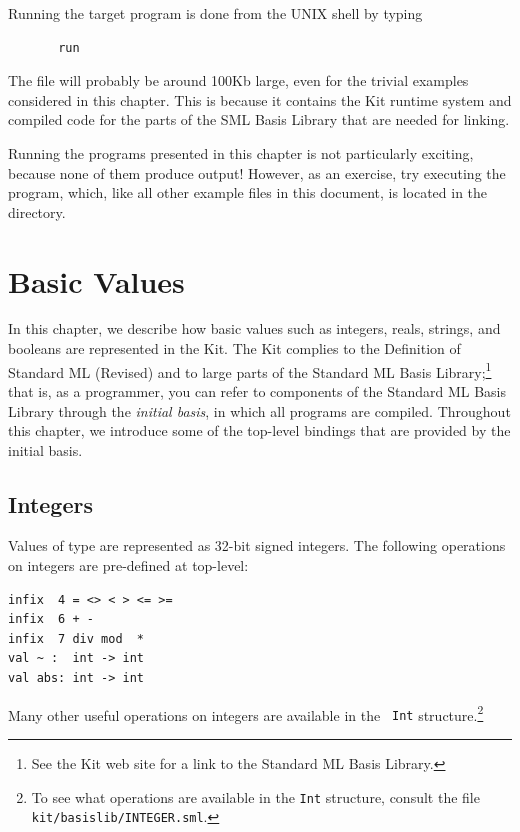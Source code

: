 \documentclass[12pt]{book}
\begin{document}
Running the target program is done from the UNIX shell by typing 
\begin{verbatim}
       run
\end{verbatim}
The file will probably be around 100Kb large, even for the trivial
examples considered in this chapter.  This is because it contains the
Kit runtime system and compiled code for the parts of the SML Basis
Library that are needed for linking.

Running the programs presented in this chapter is not particularly
exciting, because none of them produce output! However, as an
exercise, try executing the  program, which, like all other example files in this
document, is located in the  directory.


\chapter{Basic Values}
In this chapter, we describe how basic values such as integers, reals,
strings, and booleans are represented in the Kit. The Kit complies to
the Definition of Standard ML (Revised) and to large parts of the Standard ML Basis
Library;\footnote{See the Kit web site for a link to the Standard ML
  Basis Library.} that is, as a
programmer, you can refer to components of the Standard ML Basis
Library through the {\em initial basis}, in which all programs are
compiled.  Throughout this chapter, we introduce some of the
top-level bindings that are provided by the initial basis.

\section{Integers}
\label{integers.sec}
Values of type  are represented as 32-bit signed integers.
The following operations on integers are 
pre-defined at top-level:\index{{\tt =}}\index{{\tt <>}}\index{{\tt <}}\index{{\tt >}}\index{{\tt <=}}\index{{\tt >=}}\index{{\tt +}}\index{{\tt -}}\index{{\tt *}}\index{\verb+~+}
\begin{verbatim}
infix  4 = <> < > <= >= 
infix  6 + - 
infix  7 div mod  * 
val ~ :  int -> int
val abs: int -> int
\end{verbatim}
Many other useful operations on integers are available in the {\tt
  Int} structure.\footnote{To see what operations are available in the
  {\tt Int} structure, consult the file {\tt
    kit/basislib/INTEGER.sml}.}
\end{document}
